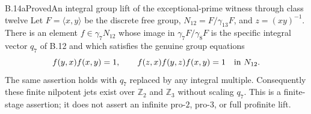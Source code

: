 \begin{statement}{B.14a}{Proved}{An integral group lift of the exceptional-prime witness through class twelve}
Let $F=\langle x,y\rangle$ be the discrete free group,
$N_{12}=F/\gamma_{13}F$, and $z=(xy)^{-1}$.
There is an element $f\in\gamma_7N_{12}$ whose image in
$\gamma_7F/\gamma_8F$ is the specific integral vector
$q_7$ of B.12 and which satisfies the genuine group equations
\[
 f(y,x)f(x,y)=1,\qquad
 f(z,x)f(y,z)f(x,y)=1
 \quad\hbox{in }N_{12}.
\]
The same assertion holds with $q_7$ replaced by any integral
multiple. Consequently these finite nilpotent jets exist over
$\mathbb Z_2$ and $\mathbb Z_3$ without scaling $q_7$.
This is a finite-stage assertion; it does not assert an infinite
pro-$2$, pro-$3$, or full profinite lift.
\end{statement}
